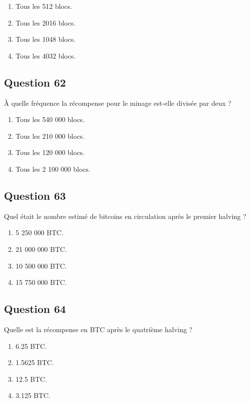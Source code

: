 \documentclass[12pt,a4paper]{article}
\begin{document}
\begin{enumerate}[label=\Alph*., leftmargin=*]
\item Tous les 512 blocs.
\item Tous les 2016 blocs.
\item Tous les 1048 blocs.
\item Tous les 4032 blocs.
\end{enumerate}

\bigskip


\subsection*{Question 62}
À quelle fréquence la récompense pour le minage est-elle divisée par deux ?

\begin{enumerate}[label=\Alph*., leftmargin=*]
\item Tous les 540 000 blocs.
\item Tous les 210 000 blocs.
\item Tous les 120 000 blocs.
\item Tous les 2 100 000 blocs.
\end{enumerate}

\bigskip


\subsection*{Question 63}
Quel était le nombre estimé de bitcoins en circulation après le premier halving ?

\begin{enumerate}[label=\Alph*., leftmargin=*]
\item 5 250 000 BTC.
\item 21 000 000 BTC.
\item 10 500 000 BTC.
\item 15 750 000 BTC.
\end{enumerate}

\bigskip


\subsection*{Question 64}
Quelle est la récompense en BTC après le quatrième halving ?

\begin{enumerate}[label=\Alph*., leftmargin=*]
\item 6.25 BTC.
\item 1.5625 BTC.
\item 12.5 BTC.
\item 3.125 BTC.
\end{enumerate}
\end{document}
